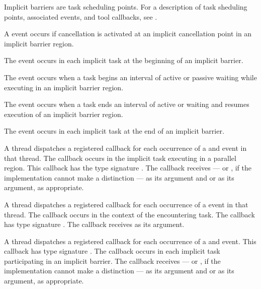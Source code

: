 Implicit barriers are task scheduling points. For a description of
task sheduling points, associated events, and tool callbacks, see
.

\events

A  event occurs if cancellation is activated at an
implicit cancellation point in an implicit barrier region.

The  event occurs in each implicit task
at the beginning of an implicit barrier.

The  event occurs when a task begins an interval of
active or passive waiting while executing in an implicit barrier region.

The  event occurs when a task ends an interval of
active or waiting and resumes execution of an implicit barrier region.

The  event occurs in each implicit task
at the end of an implicit barrier.

\tools

A thread dispatches a registered 
callback for each occurrence of a  and
 event in that thread.  The callback occurs
in the implicit task executing in a parallel region.
This callback has the type signature
.  The callback receives
 --- or
, if the implementation cannot make a
distinction --- as its  argument and
 or  as its
 argument, as appropriate.

A thread dispatches a registered 
callback for each occurrence of a  event in that thread.
The callback occurs in the context of the encountering task.  The
callback has type signature .  The
callback receives  as its 
argument.

A thread dispatches a registered
 callback for each occurrence
of a  and
 event.  This callback has type
signature .  The callback occurs
in each implicit task participating in an implicit barrier.  The
callback receives  --- or
, if the implementation cannot make a
distinction --- as its 
argument and  or  as
its  argument, as appropriate.

